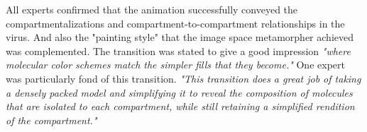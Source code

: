 









All experts confirmed that the animation successfully conveyed the compartmentalizations and compartment-to-compartment relationships in the virus. And also the "painting style" that the image space metamorpher achieved was complemented. The transition was stated to give a good impression \textit{"where molecular color schemes match the simpler fills that they become."}
One expert was particularly fond of this transition. \textit{"This transition does a great job of taking a densely packed model and simplifying it to reveal the composition of molecules that are isolated to each compartment, while still retaining a simplified rendition of the compartment."}

